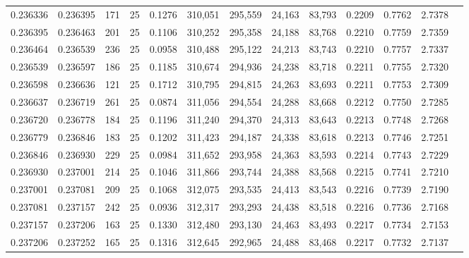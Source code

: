 \begin{tabular}{rrrrrrrrrrrrr}
0.236336 & 0.236395 &   171 &  25 &                                     0.1276 & 310,051 & 295,559 &  24,163 &  83,793 & 0.2209 & 0.7762 & 2.7378 \\
0.236395 & 0.236463 &   201 &  25 &                                     0.1106 & 310,252 & 295,358 &  24,188 &  83,768 & 0.2210 & 0.7759 & 2.7359 \\
0.236464 & 0.236539 &   236 &  25 &                                     0.0958 & 310,488 & 295,122 &  24,213 &  83,743 & 0.2210 & 0.7757 & 2.7337 \\
0.236539 & 0.236597 &   186 &  25 &                                     0.1185 & 310,674 & 294,936 &  24,238 &  83,718 & 0.2211 & 0.7755 & 2.7320 \\
0.236598 & 0.236636 &   121 &  25 &                                     0.1712 & 310,795 & 294,815 &  24,263 &  83,693 & 0.2211 & 0.7753 & 2.7309 \\
0.236637 & 0.236719 &   261 &  25 &                                     0.0874 & 311,056 & 294,554 &  24,288 &  83,668 & 0.2212 & 0.7750 & 2.7285 \\
0.236720 & 0.236778 &   184 &  25 &                                     0.1196 & 311,240 & 294,370 &  24,313 &  83,643 & 0.2213 & 0.7748 & 2.7268 \\
0.236779 & 0.236846 &   183 &  25 &                                     0.1202 & 311,423 & 294,187 &  24,338 &  83,618 & 0.2213 & 0.7746 & 2.7251 \\
0.236846 & 0.236930 &   229 &  25 &                                     0.0984 & 311,652 & 293,958 &  24,363 &  83,593 & 0.2214 & 0.7743 & 2.7229 \\
0.236930 & 0.237001 &   214 &  25 &                                     0.1046 & 311,866 & 293,744 &  24,388 &  83,568 & 0.2215 & 0.7741 & 2.7210 \\
0.237001 & 0.237081 &   209 &  25 &                                     0.1068 & 312,075 & 293,535 &  24,413 &  83,543 & 0.2216 & 0.7739 & 2.7190 \\
0.237081 & 0.237157 &   242 &  25 &                                     0.0936 & 312,317 & 293,293 &  24,438 &  83,518 & 0.2216 & 0.7736 & 2.7168 \\
0.237157 & 0.237206 &   163 &  25 &                                     0.1330 & 312,480 & 293,130 &  24,463 &  83,493 & 0.2217 & 0.7734 & 2.7153 \\
0.237206 & 0.237252 &   165 &  25 &                                     0.1316 & 312,645 & 292,965 &  24,488 &  83,468 & 0.2217 & 0.7732 & 2.7137 \\

\end{tabular}
